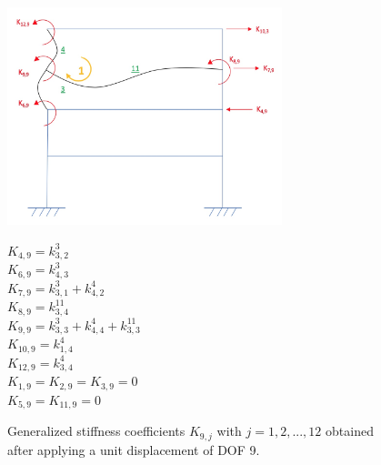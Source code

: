 \documentclass[11pt,a4paper,titlepage]{report}
\begin{document}
\begin{figure} [h]
\begin{minipage}{0.59\linewidth}
        \centering
         \includegraphics[width=8cm]{U=9.jpeg}
\end{minipage}
\begin{minipage}{0.4\linewidth}
\begin{small}
    $K_{4,9} = k^3_{3,2}$\\
    $K_{6,9} = k^3_{4,3}$\\
    $K_{7,9} = k^3_{3,1}+k^4_{4,2}$\\
    $K_{8,9} = k^{11}_{3,4}$\\
    $K_{9,9} = k^3_{3,3}+k^4_{4,4}+k^{11}_{3,3}$\\
    $K_{10,9} = k^4_{1,4}$\\
    $K_{12,9} = k^4_{3,4}$\\
    $K_{1,9} = K_{2,9} = K_{3,9} =0$\\
    $K_{5,9} = K_{11,9} = 0$\\
\end{small}
\end{minipage}
\caption{Generalized stiffness coefficients $K_{9,j}$ with $j=1,2,...,12$ obtained after applying a unit displacement of DOF 9.}
\label{fig: I.1 - u9=1}
\end{figure}
\end{document}
